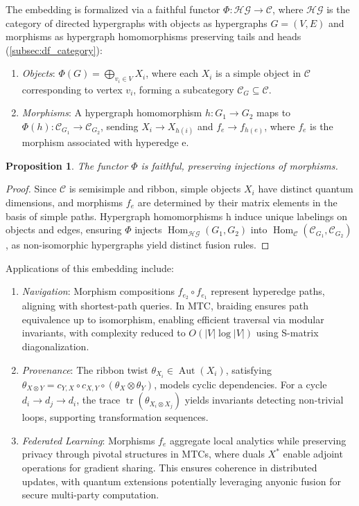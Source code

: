 \documentclass{amsart}
\newtheorem{prop}{Proposition}
\DeclareMathOperator\Aut{Aut}
\DeclareMathOperator\tr{tr}
\DeclareMathOperator\Hom{Hom}
\begin{document}
The embedding is formalized via a faithful functor \( \Phi: \mathcal{HG} \to \mathcal{C} \), where \( \mathcal{HG} \) is the category of directed hypergraphs with objects as hypergraphs \( G = (V, E) \) and morphisms as hypergraph homomorphisms preserving tails and heads (\cref{subsec:df_category}):
\begin{enumerate}
    \item \emph{Objects}: \( \Phi(G) = \bigoplus_{v_i \in V} X_i \), where each \( X_i \) is a simple object in \( \mathcal{C} \) corresponding to vertex \( v_i \), forming a subcategory \( \mathcal{C}_G \subseteq \mathcal{C} \).
    \item \emph{Morphisms}: A hypergraph homomorphism \( h: G_1 \to G_2 \) maps to \( \Phi(h): \mathcal{C}_{G_1} \to \mathcal{C}_{G_2} \), sending \( X_i \to X_{h(i)} \) and \( f_e \to f_{h(e)} \), where \( f_e \) is the morphism associated with hyperedge e.
\end{enumerate}

\begin{prop} \label{prop:faithful_functor}
The functor \( \Phi \) is faithful, preserving injections of morphisms.
\end{prop}


\begin{proof}
Since \( \mathcal{C} \) is semisimple and ribbon, simple objects \( X_i \) have distinct quantum dimensions, and morphisms \( f_e \) are determined by their matrix elements in the basis of simple paths. Hypergraph homomorphisms h induce unique labelings on objects and edges, ensuring \( \Phi \) injects $\Hom_{\mathcal{HG}}(G_1, G_2)$ into $\Hom_{\mathcal{C}}(\mathcal{C}_{G_1}, \mathcal{C}_{G_2})$, as non-isomorphic hypergraphs yield distinct fusion rules.
\end{proof}

Applications of this embedding include:

\begin{enumerate}
    \item \emph{Navigation}: Morphism compositions \( f_{e_2} \circ f_{e_1} \) represent hyperedge paths, aligning with shortest-path queries. In MTC, braiding ensures path equivalence up to isomorphism, enabling efficient traversal via modular invariants, with complexity reduced to \( O(|V| \log |V|) \) using S-matrix diagonalization.
 
    \item \emph{Provenance}: The ribbon twist \( \theta_{X_i} \in \Aut(X_i) \), satisfying \( \theta_{X \otimes Y} = c_{Y,X} \circ c_{X,Y} \circ (\theta_X \otimes \theta_Y) \), models cyclic dependencies. For a cycle \( d_i \to d_j \to d_i \), the trace $\tr(\theta_{X_i \otimes X_j})$ yields invariants detecting non-trivial loops, supporting transformation sequences.

    \item \emph{Federated Learning}: Morphisms \( f_e \) aggregate local analytics while preserving privacy through pivotal structures in MTCs, where duals \( X^* \) enable adjoint operations for gradient sharing. This ensures coherence in distributed updates, with quantum extensions potentially leveraging anyonic fusion for secure multi-party computation.
\end{enumerate}
\end{document}
